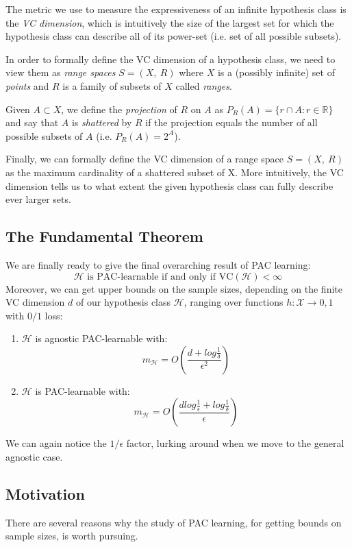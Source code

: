 \documentclass[11pt]{sigplanconf}
\renewcommand\it{\textit}
\renewcommand\H{\mathcal{H}}
\newcommand\X{\mathcal{X}}
\newcommand\R{\mathds{R}}
\begin{document}
The metric we use to measure the expressiveness of an infinite hypothesis class is the \it{VC dimension}, which is intuitively the size of the largest set for which the hypothesis class can describe all of its power-set (i.e. set of all possible subsets).

In order to formally define the VC dimension of a hypothesis class, we need to view them as \it{range spaces} $S=(X,\ R)$ where $X$ is a (possibly infinite) set of \it{points} and $R$ is a family of subsets of $X$ called \it{ranges}.

Given $A \subset X$, we define the \it{projection} of $R$ on $A$ as
$P_R(A) = \{ r \cap A : r \in \R \}$ and say that $A$ is \it{shattered} by $R$ if the projection equals the number of all possible subsets of $A$ (i.e. $P_R(A) = 2^A$).

Finally, we can formally define the VC dimension of a range space $S=(X,\ R)$ as the maximum cardinality of a shattered subset of X. More intuitively, the VC dimension tells us to what extent the given hypothesis class can fully describe ever larger sets.

\subsection{The Fundamental Theorem}
We are finally ready to give the final overarching result of PAC learning:\\
\[ \H \text{ is PAC-learnable if and only if VC} (\H) < \infty
\]
Moreover, we can get upper bounds on the sample sizes, depending on the finite VC dimension $d$ of our hypothesis class $\H$, ranging over functions $h : \X \to {0,1}$ with $0/1$ loss:
\begin{enumerate}
\item $\H$ is agnostic PAC-learnable with:
\[ m_\H = O(\frac{d + log\frac{1}{\delta}}{\epsilon^2})
\]
\item $\H$ is PAC-learnable with:
\[ m_\H = O(\frac{dlog\frac{1}{\epsilon} + log\frac{1}{\delta}}{\epsilon})
\]
\end{enumerate}
We can again notice the $1/\epsilon$ factor, lurking around when we move to the general agnostic case.

\subsection{Motivation}
There are several reasons why the study of PAC learning, for getting bounds on sample sizes, is worth pursuing.
\end{document}
